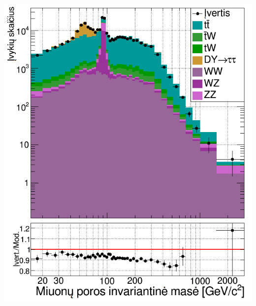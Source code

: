 \documentclass[xcolor=dvipsnames]{beamer}
\begin{document}
\begin{frame}
\begin{minipage}{0.46\textwidth}
		\includegraphics[width=\linewidth]{mumuMassEst_SMALL.png}
	\end{minipage}
\end{frame}
\end{document}
